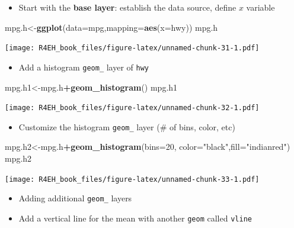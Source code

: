 \documentclass[]{book}
\newenvironment{Shaded}{\begin{snugshade}}{\end{snugshade}}
\newcommand{\KeywordTok}[1]{\textcolor[rgb]{0.13,0.29,0.53}{\textbf{#1}}}
\newcommand{\DataTypeTok}[1]{\textcolor[rgb]{0.13,0.29,0.53}{#1}}
\newcommand{\DecValTok}[1]{\textcolor[rgb]{0.00,0.00,0.81}{#1}}
\newcommand{\StringTok}[1]{\textcolor[rgb]{0.31,0.60,0.02}{#1}}
\newcommand{\OperatorTok}[1]{\textcolor[rgb]{0.81,0.36,0.00}{\textbf{#1}}}
\newcommand{\NormalTok}[1]{#1}
\providecommand{\tightlist}{%
  \setlength{\itemsep}{0pt}\setlength{\parskip}{0pt}}
\theoremstyle{definition}
\theoremstyle{definition}
\theoremstyle{definition}
\theoremstyle{remark}
\begin{document}
\begin{itemize}
\tightlist
\item
  Start with the \textbf{base layer}: establish the data source, define
  \(x\) variable
\end{itemize}

\begin{Shaded}
\begin{Highlighting}[]
\NormalTok{mpg.h<-}\KeywordTok{ggplot}\NormalTok{(}\DataTypeTok{data=}\NormalTok{mpg,}\DataTypeTok{mapping=}\KeywordTok{aes}\NormalTok{(}\DataTypeTok{x=}\NormalTok{hwy))}
\NormalTok{mpg.h}
\end{Highlighting}
\end{Shaded}

\texttt{[image: R4EH\_book\_files/figure-latex/unnamed-chunk-31-1.pdf]}

\begin{itemize}
\tightlist
\item
  Add a histogram \texttt{geom\_} layer of \texttt{hwy}
\end{itemize}

\begin{Shaded}
\begin{Highlighting}[]
\NormalTok{mpg.h1<-mpg.h}\OperatorTok{+}\KeywordTok{geom_histogram}\NormalTok{()}
\NormalTok{mpg.h1}
\end{Highlighting}
\end{Shaded}

\texttt{[image: R4EH\_book\_files/figure-latex/unnamed-chunk-32-1.pdf]}

\begin{itemize}
\tightlist
\item
  Customize the histogram \texttt{geom\_} layer (\# of bins, color, etc)
\end{itemize}

\begin{Shaded}
\begin{Highlighting}[]
\NormalTok{mpg.h2<-mpg.h}\OperatorTok{+}\KeywordTok{geom_histogram}\NormalTok{(}\DataTypeTok{bins=}\DecValTok{20}\NormalTok{, }\DataTypeTok{color=}\StringTok{"black"}\NormalTok{,}\DataTypeTok{fill=}\StringTok{"indianred"}\NormalTok{)}
\NormalTok{mpg.h2}
\end{Highlighting}
\end{Shaded}

\texttt{[image: R4EH\_book\_files/figure-latex/unnamed-chunk-33-1.pdf]}

\begin{itemize}
\item
  Adding additional \texttt{geom\_} layers
\item
  Add a vertical line for the mean with another \texttt{geom} called
  \texttt{vline}
\end{itemize}
\end{document}
